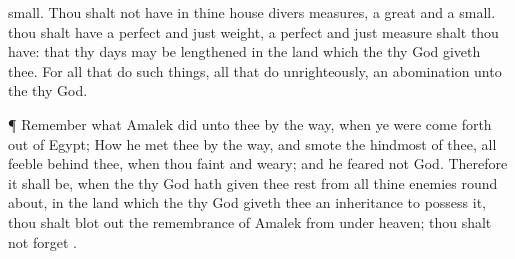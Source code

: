 {small.
Thou shalt not have in thine
house divers
measures, a
great and a
small.
 thou shalt have a
perfect and
just
weight, a
perfect and
just
measure shalt thou have: that thy
days may be
lengthened in the
land which the
{} thy
God
giveth thee.
For all that
do such
things,
{} all that
do
unrighteously,
{} an
abomination unto the
{} thy
God.
\par }{\PP {}¶
Remember what
Amalek
did unto thee by the
way, when ye were come
forth out of
Egypt;
How he
met thee by the
way, and smote the
hindmost of thee,
{} all
{}
feeble
behind thee, when thou
{}
faint and
weary; and he
feared not
God.
Therefore it shall be, when the
{} thy
God hath given thee
rest from all thine
enemies round
about, in the
land which the
{} thy
God
giveth thee
{} an
inheritance to
possess it,
{} thou shalt blot
out the
remembrance of
Amalek from under
heaven; thou shalt not
forget
{}.

}
